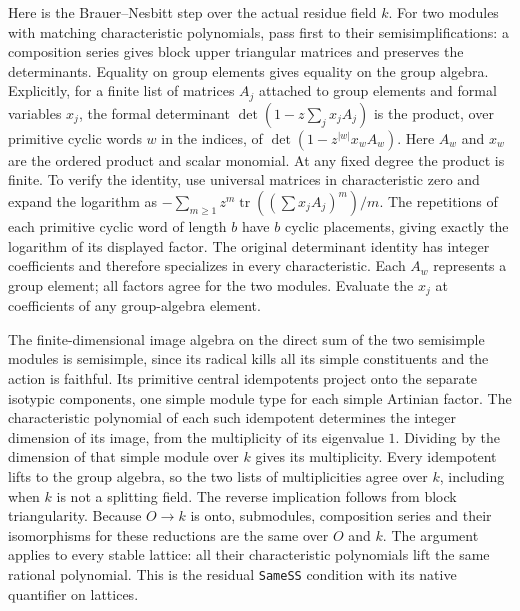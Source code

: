 Here is the Brauer--Nesbitt step over the actual residue field $k$.
For two modules with matching characteristic polynomials, pass first to
their semisimplifications: a composition series gives block upper
triangular matrices and preserves the determinants. Equality on group
elements gives equality on the group algebra. Explicitly, for a finite
list of matrices $A_j$ attached to group elements and formal variables
$x_j$, the formal determinant
$\det(1-z\sum_j x_j A_j)$ is the product, over primitive cyclic words
$w$ in the indices, of $\det(1-z^{|w|}x_w A_w)$. Here $A_w$ and
$x_w$ are the ordered product and scalar monomial. At any fixed degree
the product is finite. To verify the identity, use universal matrices
in characteristic zero and expand the logarithm as
$-\sum_{m\ge1}z^m\operatorname{tr}((\sum x_jA_j)^m)/m$.
The repetitions of each primitive cyclic word of length $b$ have
$b$ cyclic placements, giving exactly the logarithm of its displayed
factor. The original determinant identity has integer coefficients and
therefore specializes in every characteristic. Each $A_w$ represents
a group element; all factors agree for the two modules. Evaluate the
$x_j$ at coefficients of any group-algebra element.

The finite-dimensional image algebra on the direct sum of the two
semisimple modules is semisimple, since its radical kills all its simple
constituents and the action is faithful. Its primitive central
idempotents project onto the separate isotypic components, one simple
module type for each simple Artinian factor. The characteristic
polynomial of each such idempotent determines the integer dimension of
its image, from the multiplicity of its eigenvalue $1$. Dividing by
the dimension of that simple module over $k$ gives its multiplicity.
Every idempotent lifts to the group algebra, so the two lists of
multiplicities agree over $k$, including when $k$ is not a splitting
field. The reverse implication follows from block triangularity.
Because $O\to k$ is onto, submodules, composition series and their
isomorphisms for these reductions are the same over $O$ and $k$.
The argument applies to every stable lattice: all their characteristic
polynomials lift the same rational polynomial. This is the residual
\texttt{SameSS} condition with its native quantifier on lattices.

